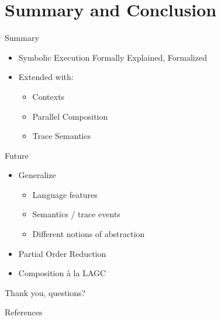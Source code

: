 \documentclass{beamer}
\begin{document}
\section{Summary and Conclusion}

\begin{frame}{Summary}
  \begin{itemize}
    \item Symbolic Execution Formally Explained, Formalized
    \item Extended with:
          \begin{itemize}
            \item Contexts
            \item Parallel Composition
            \item Trace Semantics
          \end{itemize}
  \end{itemize}
\end{frame}

\begin{frame}{Future}
  \begin{itemize}
    \item Generalize
          \begin{itemize}
            \item Language features
            \item Semantics / trace events
            \item Different notions of abstraction
          \end{itemize}
    \item \alert{Partial Order Reduction}
    \item Composition à la LAGC
  \end{itemize}
\end{frame}

\begin{frame}
  Thank you, questions?
\end{frame}

\begin{frame}{References}
  \printbibliography{}
\end{frame}
\end{document}
